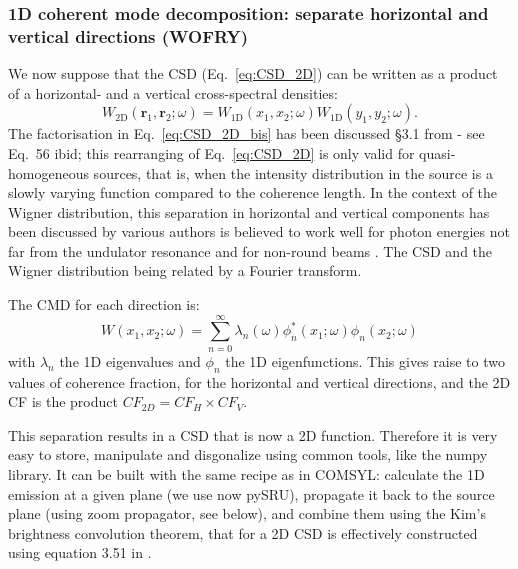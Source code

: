 \documentclass{iucr}              %
\begin{document}
\subsubsection{1D coherent mode decomposition: separate horizontal and vertical directions (WOFRY)\\}

We now suppose that the CSD (Eq.~\ref{eq:CSD_2D}) can be written as a product of a horizontal- and a vertical cross-spectral densities: 
\begin{equation}
W_\text{2D}(\textbf{r}_1,\textbf{r}_2;\omega) = W_\text{1D}(x_1,x_2;\omega)W_\text{1D}(y_1,y_2;\omega).
\label{eq:CSD_2D_bis}
\end{equation}
The factorisation in Eq.~\ref{eq:CSD_2D_bis} has been discussed §3.1 from \cite{geloni2008} - see Eq.~56 ibid; this rearranging of Eq.~\ref{eq:CSD_2D} is only valid for quasi-homogeneous sources, that is, when the intensity distribution in the source is a slowly varying function compared to the coherence length. In the context of the Wigner distribution, this separation in horizontal and vertical components has been discussed by various authors is believed to work well for photon energies not far from the undulator resonance and for non-round beams \cite{tanaka2014,nash2021}. The CSD and the Wigner distribution being related by a Fourier transform. 

 The CMD for each direction is:
\begin{equation}
W(x_1,x_2;\omega) = \sum_{n=0}^{\infty} \lambda_n(\omega) \phi_n^*(x_1;\omega) \phi_n(x_2;\omega) 
\label{eq:CMD1D}
\end{equation}
with $\lambda_n$ the 1D eigenvalues and $\phi_n$ the 1D eigenfunctions. This gives raise to two values of coherence fraction, for the horizontal and vertical directions, and the 2D CF is the product $CF_{2D}=CF_H \times CF_V$.

This separation results in a CSD that is now a 2D function. Therefore it is very easy to store, manipulate and disgonalize using common tools, like the numpy library. It can be built with the same recipe as in COMSYL: calculate the 1D emission at a given plane (we use now pySRU), propagate it back to the source plane (using zoom propagator, see below), and combine them using the Kim's brightness convolution theorem, that for a 2D CSD is effectively constructed using equation 3.51 in \cite{glass2017}.
\end{document}
